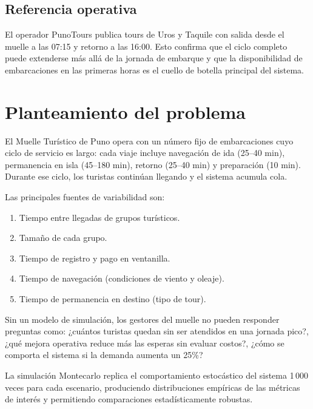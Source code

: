 \documentclass[12pt,a4paper]{article}
\begin{document}
\subsection{Referencia operativa}

El operador PunoTours publica tours de Uros y Taquile con salida desde el
muelle a las 07:15 y retorno a las 16:00. Esto confirma que el ciclo
completo puede extenderse más allá de la jornada de embarque y que la
disponibilidad de embarcaciones en las primeras horas es el cuello de
botella principal del sistema.

\section{Planteamiento del problema}

El Muelle Turístico de Puno opera con un número fijo de embarcaciones cuyo
ciclo de servicio es largo: cada viaje incluye navegación de ida (25--40
min), permanencia en isla (45--180 min), retorno (25--40 min) y
preparación (10 min). Durante ese ciclo, los turistas continúan llegando y
el sistema acumula cola.

\medskip
Las principales fuentes de variabilidad son:

\begin{enumerate}[noitemsep]
  \item Tiempo entre llegadas de grupos turísticos.
  \item Tamaño de cada grupo.
  \item Tiempo de registro y pago en ventanilla.
  \item Tiempo de navegación (condiciones de viento y oleaje).
  \item Tiempo de permanencia en destino (tipo de tour).
\end{enumerate}

\medskip
Sin un modelo de simulación, los gestores del muelle no pueden responder
preguntas como: ¿cuántos turistas quedan sin ser atendidos en una jornada
pico?, ¿qué mejora operativa reduce más las esperas sin evaluar costos?,
¿cómo se comporta el sistema si la demanda aumenta un 25\%?

La simulación Montecarlo replica el comportamiento estocástico del sistema
1\,000 veces para cada escenario, produciendo distribuciones empíricas de
las métricas de interés y permitiendo comparaciones estadísticamente
robustas.
\end{document}
